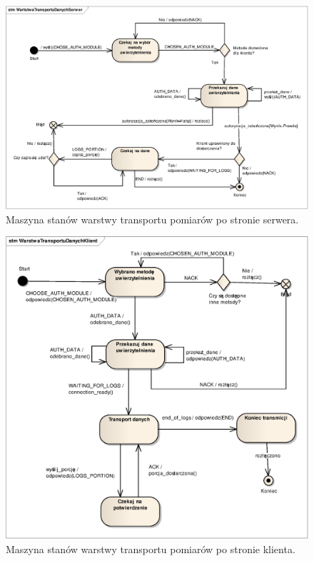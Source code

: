 \begin{figure}[ht]
  \caption{Maszyna stanów warstwy transportu pomiarów po stronie serwera.}
  \label{fig:transportSerwer}
  \centering
\includegraphics[width=1\textwidth]{img/transpSerwer}
\end{figure}

\begin{figure}[ht]
  \caption{Maszyna stanów warstwy transportu pomiarów po stronie klienta.}
  \label{fig:transportKlient}
  \centering
\includegraphics[width=1\textwidth]{img/transpKlient}
\end{figure}

